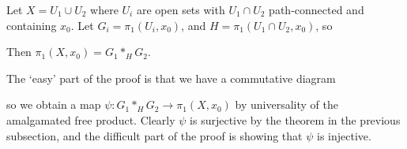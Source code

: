 \begin{theorem}
	Let \( X = U_1 \cup U_2 \) where \( U_i \) are open sets with \( U_1 \cap U_2 \) path-connected and containing \( x_0 \).
	Let \( G_i = \pi_1(U_i, x_0) \), and \( H = \pi_1(U_1 \cap U_2, x_0) \), so
	\begin{center}
	\end{center}
	Then \( \pi_1(X, x_0) = G_1 \ast_H G_2 \).
\end{theorem}
\begin{remark}
	The `easy' part of the proof is that we have a commutative diagram
	\begin{center}
	\end{center}
	so we obtain a map \( \psi \colon G_1 \ast_H G_2 \to \pi_1(X,x_0) \) by universality of the amalgamated free product.
	Clearly \( \psi \) is surjective by the theorem in the previous subsection, and the difficult part of the proof is showing that \( \psi \) is injective.
\end{remark}
